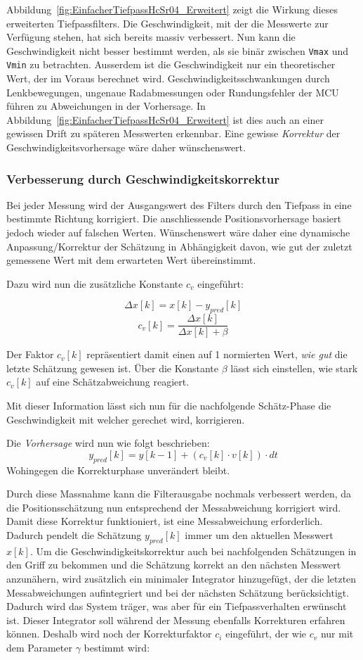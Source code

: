 \documentclass[main.tex]{subfiles} %
\begin{document}
Abbildung~\ref{fig:EinfacherTiefpassHcSr04_Erweitert} zeigt die Wirkung dieses
erweiterten Tiefpassfilters. Die Geschwindigkeit, mit der die Messwerte zur
Verfügung stehen, hat sich bereits massiv verbessert. Nun kann die
Geschwindigkeit nicht besser bestimmt werden, als sie binär zwischen
\texttt{Vmax} und \texttt{Vmin} zu betrachten. Ausserdem ist die
Geschwindigkeit nur ein theoretischer Wert, der im Voraus berechnet wird.
Geschwindigkeitsschwankungen durch Lenkbewegungen, ungenaue Radabmessungen oder
Rundungsfehler der MCU führen zu Abweichungen in der Vorhersage. In
Abbildung~\ref{fig:EinfacherTiefpassHcSr04_Erweitert} ist dies auch an einer
gewissen Drift zu späteren Messwerten erkennbar. Eine gewisse
\textit{Korrektur} der Geschwindigkeitsvorhersage wäre daher wünschenswert.

\subsubsection*{Verbesserung durch Geschwindigkeitskorrektur}

Bei jeder Messung wird der Ausgangswert des Filters durch den Tiefpass in eine
bestimmte Richtung korrigiert. Die anschliessende Positionsvorhersage basiert
jedoch wieder auf falschen Werten. Wünschenswert wäre daher eine dynamische
Anpassung/Korrektur der Schätzung in Abhängigkeit davon, wie gut der zuletzt
gemessene Wert mit dem erwarteten Wert übereinstimmt.

Dazu wird nun die zusätzliche Konstante $c_v$ eingeführt:

\[
    \Delta x[k] = x[k] - y_{pred}[k]
\]
\[
    c_v[k] = \frac{\Delta x[k]}{\Delta x[k] + \beta}
\]

Der Faktor $c_v[k]$ repräsentiert damit einen auf 1 normierten Wert,
\textit{wie gut} die letzte Schätzung gewesen ist. Über die Konstante $\beta$
lässt sich einstellen, wie stark $c_v[k]$ auf eine Schätzabweichung reagiert.

Mit dieser Information lässt sich nun für die nachfolgende Schätz-Phase die
Geschwindigkeit mit welcher gerechet wird, korrigieren.

Die \textit{Vorhersage} wird nun wie folgt beschrieben:
\[
    y_{pred}[k] = y[k - 1] + (c_v[k] \cdot v[k]) \cdot dt
\]
Wohingegen die Korrekturphase unverändert bleibt.

Durch diese Massnahme kann die Filterausgabe nochmals verbessert werden, da die
Positionsschätzung nun entsprechend der Messabweichung korrigiert wird. Damit
diese Korrektur funktioniert, ist eine Messabweichung erforderlich. Dadurch
pendelt die Schätzung $y_{pred}[k]$ immer um den aktuellen Messwert $x[k]$. Um
die Geschwindigkeitskorrektur auch bei nachfolgenden Schätzungen in den Griff
zu bekommen und die Schätzung korrekt an den nächsten Messwert anzunähern, wird
zusätzlich ein minimaler Integrator hinzugefügt, der die letzten
Messabweichungen aufintegriert und bei der nächsten Schätzung berücksichtigt.
Dadurch wird das System träger, was aber für ein Tiefpassverhalten erwünscht
ist. Dieser Integrator soll während der Messung ebenfalls Korrekturen erfahren
können. Deshalb wird noch der Korrekturfaktor $c_i$ eingeführt, der wie $c_v$
nur mit dem Parameter $\gamma$ bestimmt wird:
\end{document}
